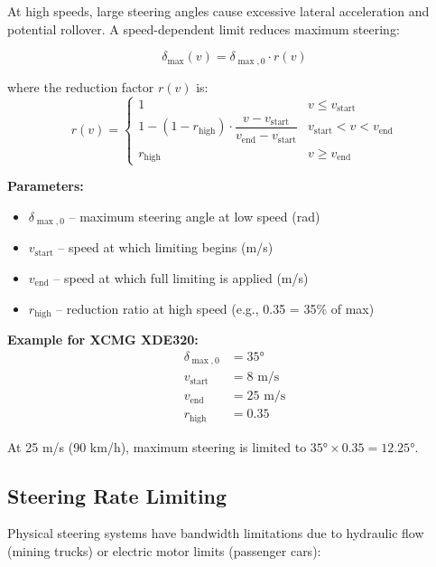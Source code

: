 \documentclass[11pt,a4paper]{article}
\begin{document}
At high speeds, large steering angles cause excessive lateral acceleration and potential rollover. A speed-dependent limit reduces maximum steering:

\begin{equation}
\delta_{\max}(v) = \delta_{\max,0} \cdot r(v)
\end{equation}

where the reduction factor $r(v)$ is:
\begin{equation}
\boxed{r(v) = \begin{cases}
1 & v \leq v_{\text{start}} \\
1 - (1 - r_{\text{high}}) \cdot \dfrac{v - v_{\text{start}}}{v_{\text{end}} - v_{\text{start}}} & v_{\text{start}} < v < v_{\text{end}} \\
r_{\text{high}} & v \geq v_{\text{end}}
\end{cases}}
\label{eq:speed_steering_limit}
\end{equation}

\textbf{Parameters:}
\begin{itemize}
    \item $\delta_{\max,0}$ -- maximum steering angle at low speed (rad)
    \item $v_{\text{start}}$ -- speed at which limiting begins (m/s)
    \item $v_{\text{end}}$ -- speed at which full limiting is applied (m/s)
    \item $r_{\text{high}}$ -- reduction ratio at high speed (e.g., 0.35 = 35\% of max)
\end{itemize}

\textbf{Example for XCMG XDE320:}
\begin{align}
\delta_{\max,0} &= 35° \\
v_{\text{start}} &= 8 \text{ m/s} \\
v_{\text{end}} &= 25 \text{ m/s} \\
r_{\text{high}} &= 0.35
\end{align}

At 25 m/s (90 km/h), maximum steering is limited to $35° \times 0.35 = 12.25°$.

\subsection{Steering Rate Limiting}

Physical steering systems have bandwidth limitations due to hydraulic flow (mining trucks) or electric motor limits (passenger cars):
\end{document}
